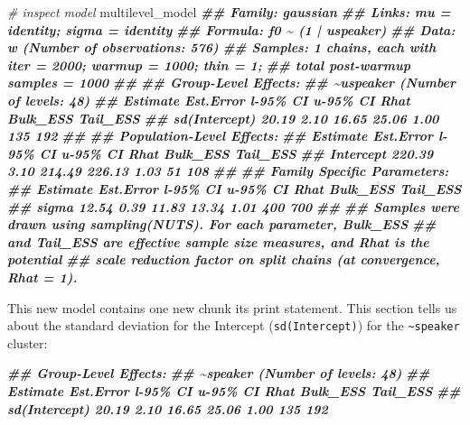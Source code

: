 \documentclass[
]{book}
\newenvironment{Shaded}{\begin{snugshade}}{\end{snugshade}}
\newcommand{\CommentTok}[1]{\textcolor[rgb]{0.56,0.35,0.01}{\textit{#1}}}
\newcommand{\DocumentationTok}[1]{\textcolor[rgb]{0.56,0.35,0.01}{\textbf{\textit{#1}}}}
\newcommand{\NormalTok}[1]{#1}
\begin{document}
\begin{Shaded}
\begin{Highlighting}[]
\CommentTok{\# inspect model}
\NormalTok{multilevel\_model}
\DocumentationTok{\#\#  Family: gaussian }
\DocumentationTok{\#\#   Links: mu = identity; sigma = identity }
\DocumentationTok{\#\# Formula: f0 \textasciitilde{} (1 | uspeaker) }
\DocumentationTok{\#\#    Data: w (Number of observations: 576) }
\DocumentationTok{\#\# Samples: 1 chains, each with iter = 2000; warmup = 1000; thin = 1;}
\DocumentationTok{\#\#          total post{-}warmup samples = 1000}
\DocumentationTok{\#\# }
\DocumentationTok{\#\# Group{-}Level Effects: }
\DocumentationTok{\#\# \textasciitilde{}uspeaker (Number of levels: 48) }
\DocumentationTok{\#\#               Estimate Est.Error l{-}95\% CI u{-}95\% CI Rhat Bulk\_ESS Tail\_ESS}
\DocumentationTok{\#\# sd(Intercept)    20.19      2.10    16.65    25.06 1.00      135      192}
\DocumentationTok{\#\# }
\DocumentationTok{\#\# Population{-}Level Effects: }
\DocumentationTok{\#\#           Estimate Est.Error l{-}95\% CI u{-}95\% CI Rhat Bulk\_ESS Tail\_ESS}
\DocumentationTok{\#\# Intercept   220.39      3.10   214.49   226.13 1.03       51      108}
\DocumentationTok{\#\# }
\DocumentationTok{\#\# Family Specific Parameters: }
\DocumentationTok{\#\#       Estimate Est.Error l{-}95\% CI u{-}95\% CI Rhat Bulk\_ESS Tail\_ESS}
\DocumentationTok{\#\# sigma    12.54      0.39    11.83    13.34 1.01      400      700}
\DocumentationTok{\#\# }
\DocumentationTok{\#\# Samples were drawn using sampling(NUTS). For each parameter, Bulk\_ESS}
\DocumentationTok{\#\# and Tail\_ESS are effective sample size measures, and Rhat is the potential}
\DocumentationTok{\#\# scale reduction factor on split chains (at convergence, Rhat = 1).}
\end{Highlighting}
\end{Shaded}

This new model contains one new chunk its print statement. This section tells us about the standard deviation for the Intercept (\texttt{sd(Intercept)}) for the \texttt{\textasciitilde{}speaker} cluster:

\begin{Shaded}
\begin{Highlighting}[]
\DocumentationTok{\#\# Group{-}Level Effects: }
\DocumentationTok{\#\# \textasciitilde{}speaker (Number of levels: 48) }
\DocumentationTok{\#\#               Estimate Est.Error l{-}95\% CI u{-}95\% CI Rhat Bulk\_ESS Tail\_ESS}
\DocumentationTok{\#\# sd(Intercept)    20.19      2.10    16.65    25.06 1.00      135      192}
\end{Highlighting}
\end{Shaded}
\end{document}
